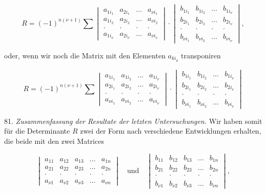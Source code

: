 \documentclass[11pt]{article}
\providecommand{\weq}[2]{\begin{equation}\tag{#1}#2\end{equation}}
\begin{document}
\[
R=(-1)^{n(\nu+1)}\sum
\begin{vmatrix}
a_{1i_1} & a_{2i_1} & \dots & a_{\nu i_1}\\
a_{1i_2} & a_{2i_2} & \dots & a_{\nu i_2}\\
\cdot & \cdot & \cdot & \cdot\\
a_{1i_\nu} & a_{2i_\nu} & \dots & a_{\nu i_\nu}
\end{vmatrix}
\cdot
\begin{vmatrix}
b_{1i_1} & b_{1i_2} & \dots & b_{1i_\nu}\\
b_{2i_1} & b_{2i_2} & \dots & b_{2i_\nu}\\
\cdot & \cdot & \cdot & \cdot\\
b_{\nu i_1} & b_{\nu i_2} & \dots & b_{\nu i_\nu}
\end{vmatrix},
\]

oder, wenn wir noch die Matrix mit den Elementen $a_{k i_\varrho}$ transponiren

\weq{F}{
R=(-1)^{n(\nu+1)}\sum
\begin{vmatrix}
a_{1i_1} & a_{1i_2} & \dots & a_{1i_\nu}\\
a_{2i_1} & a_{2i_2} & \dots & a_{2i_\nu}\\
\cdot & \cdot & \cdot & \cdot\\
a_{\nu i_1} & a_{\nu i_2} & \dots & a_{\nu i_\nu}
\end{vmatrix}
\cdot
\begin{vmatrix}
b_{1i_1} & b_{1i_2} & \dots & b_{1i_\nu}\\
b_{2i_1} & b_{2i_2} & \dots & b_{2i_\nu}\\
\cdot & \cdot & \cdot & \cdot\\
b_{\nu i_1} & b_{\nu i_2} & \dots & b_{\nu i_\nu}
\end{vmatrix}
}

81. \textit{Zusammenfassung der Resultate der letzten Untersuchungen.} Wir haben somit für die Determinante $R$ zwei der Form nach verschiedene Entwicklungen erhalten, die beide mit den zwei Matrices

\[
\begin{vmatrix}
a_{11} & a_{12} & a_{13} & \dots & a_{1n}\\
a_{21} & a_{22} & a_{23} & \dots & a_{2n}\\
\cdot & \cdot & \cdot & \cdot & \cdot\\
a_{\nu 1} & a_{\nu 2} & a_{\nu 3} & \dots & a_{\nu n}
\end{vmatrix}
\quad\text{und}\quad
\begin{vmatrix}
b_{11} & b_{12} & b_{13} & \dots & b_{1n}\\
b_{21} & b_{22} & b_{23} & \dots & b_{2n}\\
\cdot & \cdot & \cdot & \cdot & \cdot\\
b_{\nu 1} & b_{\nu 2} & b_{\nu 3} & \dots & b_{\nu n}
\end{vmatrix},
\]
\end{document}
